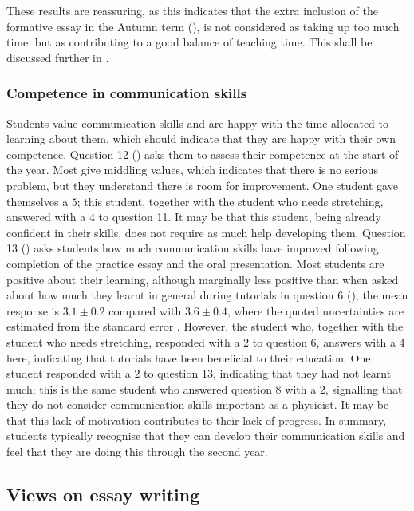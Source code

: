 These results are reassuring, as this indicates that the extra inclusion of the formative essay in the Autumn term (), is not considered as taking up too much time, but as contributing to a good balance of teaching time. This shall be discussed further in .

\subsubsection{Competence in communication skills}\label{sec:comm-level}

Students value communication skills and are happy with the time allocated to learning about them, which should indicate that they are happy with their own competence. Question 12 () asks them to assess their competence at the start of the year. Most give middling values, which indicates that there is no serious problem, but they understand there is room for improvement. One student gave themselves a $5$; this student, together with the student who needs stretching, answered with a $4$ to question 11. It may be that this student, being already confident in their skills, does not require as much help developing them. Question 13 () asks students how much communication skills have improved following completion of the practice essay and the oral presentation. Most students are positive about their learning, although marginally less positive than when asked about how much they learnt in general during tutorials in question 6 (), the mean response is $3.1\pm0.2$ compared with $3.6\pm0.4$, where the quoted uncertainties are estimated from the standard error \citep[chapter 22]{Mackay2003}. However, the student who, together with the student who needs stretching, responded with a $2$ to question 6, answers with a $4$ here, indicating that tutorials have been beneficial to their education. One student responded with a $2$ to question 13, indicating that they had not learnt much; this is the same student who answered question 8 with a $2$, signalling that they do not consider communication skills important as a physicist. It may be that this lack of motivation contributes to their lack of progress. In summary, students typically recognise that they can develop their communication skills and feel that they are doing this through the second year.

\subsection{Views on essay writing}\label{sec:essay-results}

